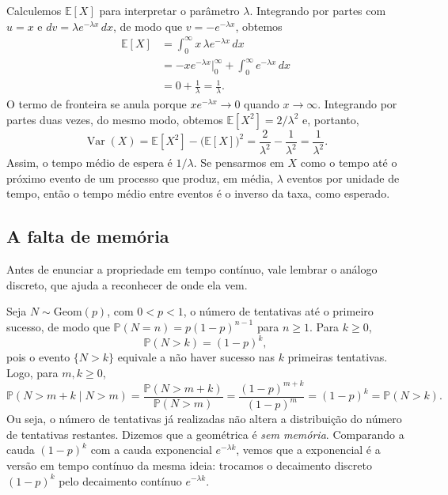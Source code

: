 \begin{example}\label{ex:media-variancia-exponencial}
Calculemos $\mathbb{E}[X]$ para interpretar o parâmetro $\lambda$.
Integrando por partes com $u=x$ e $dv=\lambda e^{-\lambda x}\,dx$, de modo que
$v=-e^{-\lambda x}$, obtemos
\begin{align*}
  \mathbb{E}[X]
  &=\int_0^{\infty} x\,\lambda e^{-\lambda x}\,dx
  \\[0.3cm]
  &=-x e^{-\lambda x}\Big|_0^{\infty}
    +\int_0^{\infty} e^{-\lambda x}\,dx
  \\[0.3cm]
  &=0+\frac{1}{\lambda}
  =\frac{1}{\lambda}.
\end{align*}
O termo de fronteira se anula porque $x e^{-\lambda x}\to 0$ quando
$x\to\infty$. Integrando por partes duas vezes, do mesmo modo, obtemos
$\mathbb{E}[X^2]=2/\lambda^2$ e, portanto,
\[
  \operatorname{Var}(X)
  =\mathbb{E}[X^2]-\bigl(\mathbb{E}[X]\bigr)^2
  =\frac{2}{\lambda^2}-\frac{1}{\lambda^2}
  =\frac{1}{\lambda^2}.
\]
Assim, o tempo médio de espera é $1/\lambda$. Se pensarmos em $X$ como o
tempo até o próximo evento de um processo que produz, em média, $\lambda$
eventos por unidade de tempo, então o tempo médio entre eventos é o inverso
da taxa, como esperado.
\end{example}

\subsection{A falta de memória}

Antes de enunciar a propriedade em tempo contínuo, vale lembrar o análogo
discreto, que ajuda a reconhecer de onde ela vem.

\begin{example}\label{ex:geometrica-sem-memoria}
Seja $N\sim\mathrm{Geom}(p)$, com $0<p<1$, o número de tentativas até o
primeiro sucesso, de modo que $\mathbb{P}(N=n)=p(1-p)^{n-1}$ para
$n\geqslant 1$. Para $k\geqslant 0$,
\[
  \mathbb{P}(N>k)=(1-p)^k,
\]
pois o evento $\{N>k\}$ equivale a não haver sucesso nas $k$ primeiras
tentativas. Logo, para $m,k\geqslant 0$,
\[
  \mathbb{P}(N>m+k\mid N>m)
  =\frac{\mathbb{P}(N>m+k)}{\mathbb{P}(N>m)}
  =\frac{(1-p)^{m+k}}{(1-p)^m}
  =(1-p)^k
  =\mathbb{P}(N>k).
\]
Ou seja, o número de tentativas já realizadas não altera a distribuição do
número de tentativas restantes. Dizemos que a geométrica é \emph{sem
memória}. Comparando a cauda $(1-p)^k$ com a cauda exponencial
$e^{-\lambda k}$, vemos que a exponencial é a versão em tempo contínuo da
mesma ideia: trocamos o decaimento discreto $(1-p)^k$ pelo decaimento
contínuo $e^{-\lambda k}$.
\end{example}

